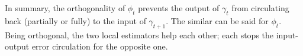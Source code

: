 \documentclass[journal]{IEEEtran}
\renewcommand{\bf}{\bm}
\newcommand{\LLC}[1]{\textcolor{black}{#1}}%
\begin{document}
In summary, the orthogonality of $\phi_t $ prevents the output of $\gamma_t $ from circulating back (partially or fully) to the input of $\gamma_{t+1} $. The similar can be said for $\phi_t $. Being orthogonal, the two local estimators help each other; each stops the input-output error circulation for the opposite one.

\end{document}
